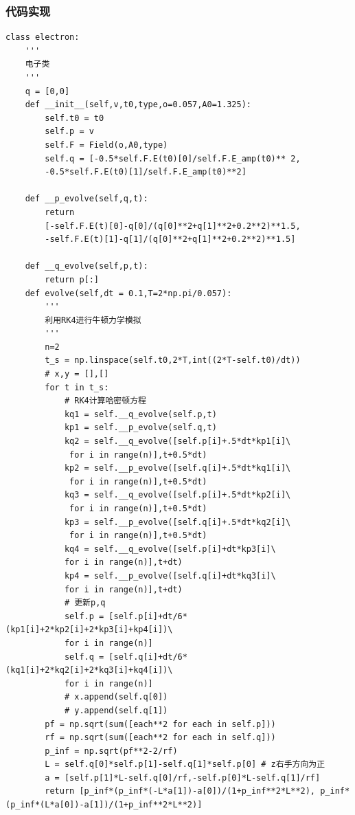 \documentclass[a4paper]{ctexart}
\begin{document}
\subsubsection{代码实现}
\begin{lstlisting}
class electron:
	'''
	电子类
	'''
	q = [0,0]
	def __init__(self,v,t0,type,o=0.057,A0=1.325):
		self.t0 = t0
		self.p = v
		self.F = Field(o,A0,type)
		self.q = [-0.5*self.F.E(t0)[0]/self.F.E_amp(t0)** 2,
		-0.5*self.F.E(t0)[1]/self.F.E_amp(t0)**2]
	
	def __p_evolve(self,q,t):
		return
		[-self.F.E(t)[0]-q[0]/(q[0]**2+q[1]**2+0.2**2)**1.5,
		-self.F.E(t)[1]-q[1]/(q[0]**2+q[1]**2+0.2**2)**1.5]
	
	def __q_evolve(self,p,t):
		return p[:]
	def evolve(self,dt = 0.1,T=2*np.pi/0.057):
		'''
		利用RK4进行牛顿力学模拟
		'''
		n=2
		t_s = np.linspace(self.t0,2*T,int((2*T-self.t0)/dt))
		# x,y = [],[]
		for t in t_s:
			# RK4计算哈密顿方程
			kq1 = self.__q_evolve(self.p,t)
			kp1 = self.__p_evolve(self.q,t)
			kq2 = self.__q_evolve([self.p[i]+.5*dt*kp1[i]\
			 for i in range(n)],t+0.5*dt)
			kp2 = self.__p_evolve([self.q[i]+.5*dt*kq1[i]\
			 for i in range(n)],t+0.5*dt)
			kq3 = self.__q_evolve([self.p[i]+.5*dt*kp2[i]\
			 for i in range(n)],t+0.5*dt)
			kp3 = self.__p_evolve([self.q[i]+.5*dt*kq2[i]\
			 for i in range(n)],t+0.5*dt)
			kq4 = self.__q_evolve([self.p[i]+dt*kp3[i]\
			for i in range(n)],t+dt)
			kp4 = self.__p_evolve([self.q[i]+dt*kq3[i]\ 
			for i in range(n)],t+dt)
			# 更新p,q
			self.p = [self.p[i]+dt/6*(kp1[i]+2*kp2[i]+2*kp3[i]+kp4[i])\
			for i in range(n)]
			self.q = [self.q[i]+dt/6*(kq1[i]+2*kq2[i]+2*kq3[i]+kq4[i])\
			for i in range(n)]
			# x.append(self.q[0])
			# y.append(self.q[1])
		pf = np.sqrt(sum([each**2 for each in self.p]))
		rf = np.sqrt(sum([each**2 for each in self.q]))
		p_inf = np.sqrt(pf**2-2/rf)
		L = self.q[0]*self.p[1]-self.q[1]*self.p[0] # z右手方向为正
		a = [self.p[1]*L-self.q[0]/rf,-self.p[0]*L-self.q[1]/rf]
		return [p_inf*(p_inf*(-L*a[1])-a[0])/(1+p_inf**2*L**2), p_inf*(p_inf*(L*a[0])-a[1])/(1+p_inf**2*L**2)]
\end{lstlisting}
\end{document}
